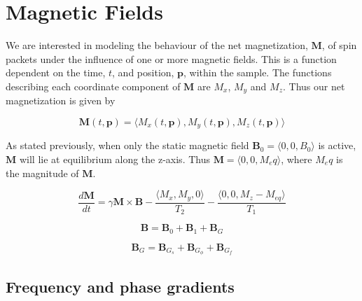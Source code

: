 \section{Magnetic Fields}


We are interested in modeling the behaviour of the net magnetization,
$\textbf{M}$, of spin packets under the influence of one or more
magnetic fields. This is a function dependent on the time, $t$, and
position, $\textbf{p}$, within the sample. The functions describing
each coordinate component of $\textbf{M}$ are $M_x$, $M_y$ and
$M_z$. Thus our net magnetization is given by

\begin{displaymath}
  \textbf{M}(t, \textbf{p}) = \langle M_x(t, \textbf{p}), M_y(t, \textbf{p}), M_z(t, \textbf{p}) \rangle
\end{displaymath}

As stated previously, when only the static magnetic field
$\mathbf{B}_0 = \langle 0, 0, B_0 \rangle$ is active, $\textbf{M}$
will lie at equilibrium along the z-axis. Thus $\textbf{M} = \langle
0, 0, M_eq \rangle$, where $M_eq$ is the magnitude of $\textbf{M}$.



\begin{displaymath}
  \frac{d\mathbf{M}}{dt} = \gamma \mathbf{M} \times \mathbf{B} -
  \frac{\langle M_x, M_y, 0 \rangle}{T_2} - \frac{\langle 0, 0, M_z -
    M_{eq} \rangle}{T_1}
\end{displaymath}


\begin{displaymath}
  \mathbf{B} = \mathbf{B}_0 + \mathbf{B}_1 + \mathbf{B}_G
\end{displaymath}

\begin{displaymath}
  \mathbf{B}_G = \mathbf{B}_{G_s} + \mathbf{B}_{G_\phi} + \mathbf{B}_{G_f}
\end{displaymath}



\subsection{Frequency and phase gradients}


